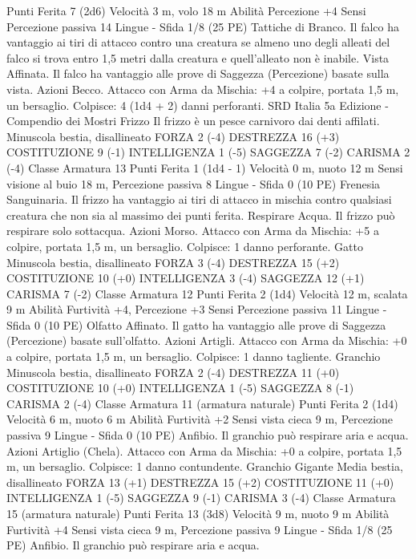 \begin{multicols}{2}
Punti Ferita 7 (2d6)
Velocità 3 m, volo 18 m
Abilità Percezione +4
Sensi Percezione passiva 14
Lingue -
Sfida 1/8 (25 PE)
Tattiche di Branco. Il falco ha vantaggio ai tiri di attacco contro
una creatura se almeno uno degli alleati del falco si trova entro
1,5 metri dalla creatura e quell’alleato non è inabile.
Vista Affinata. Il falco ha vantaggio alle prove di Saggezza
(Percezione) basate sulla vista.
Azioni
Becco. Attacco con Arma da Mischia: +4 a colpire, portata 1,5
m, un bersaglio.
Colpisce: 4 (1d4 + 2) danni perforanti.
SRD Italia 5a Edizione - Compendio dei Mostri
Frizzo
Il frizzo è un pesce carnivoro dai denti affilati.
Minuscola bestia, disallineato
FORZA 2 (-4)
DESTREZZA 16 (+3)
COSTITUZIONE 9 (-1)
INTELLIGENZA 1 (-5)
SAGGEZZA 7 (-2)
CARISMA 2 (-4)
Classe Armatura 13
Punti Ferita 1 (1d4 - 1)
Velocità 0 m, nuoto 12 m
Sensi visione al buio 18 m, Percezione passiva 8
Lingue -
Sfida 0 (10 PE)
Frenesia Sanguinaria. Il frizzo ha vantaggio ai tiri di attacco in
mischia contro qualsiasi creatura che non sia al massimo dei
punti ferita.
Respirare Acqua. Il frizzo può respirare solo sottacqua.
Azioni
Morso. Attacco con Arma da Mischia: +5 a colpire, portata 1,5
m, un bersaglio.
Colpisce: 1 danno perforante.
Gatto
Minuscola bestia, disallineato
FORZA 3 (-4)
DESTREZZA 15 (+2)
COSTITUZIONE 10 (+0)
INTELLIGENZA 3 (-4)
SAGGEZZA 12 (+1)
CARISMA 7 (-2)
Classe Armatura 12
Punti Ferita 2 (1d4)
Velocità 12 m, scalata 9 m
Abilità Furtività +4, Percezione +3
Sensi Percezione passiva 11
Lingue -
Sfida 0 (10 PE)
Olfatto Affinato. Il gatto ha vantaggio alle prove di Saggezza
(Percezione) basate sull’olfatto.
Azioni
Artigli. Attacco con Arma da Mischia: +0 a colpire, portata 1,5
m, un bersaglio.
Colpisce: 1 danno tagliente.
Granchio
Minuscola bestia, disallineato
FORZA 2 (-4)
DESTREZZA 11 (+0)
COSTITUZIONE 10 (+0)
INTELLIGENZA 1 (-5)
SAGGEZZA 8 (-1)
CARISMA 2 (-4)
Classe Armatura 11 (armatura naturale)
Punti Ferita 2 (1d4)
Velocità 6 m, nuoto 6 m
Abilità Furtività +2
Sensi vista cieca 9 m, Percezione passiva 9
Lingue -
Sfida 0 (10 PE)
Anfibio. Il granchio può respirare aria e acqua.
Azioni
Artiglio (Chela). Attacco con Arma da Mischia: +0 a colpire,
portata 1,5 m, un bersaglio.
Colpisce: 1 danno contundente.
Granchio Gigante
Media bestia, disallineato
FORZA 13 (+1)
DESTREZZA 15 (+2)
COSTITUZIONE 11 (+0)
INTELLIGENZA 1 (-5)
SAGGEZZA 9 (-1)
CARISMA 3 (-4)
Classe Armatura 15 (armatura naturale)
Punti Ferita 13 (3d8)
Velocità 9 m, nuoto 9 m
Abilità Furtività +4
Sensi vista cieca 9 m, Percezione passiva 9
Lingue -
Sfida 1/8 (25 PE)
Anfibio. Il granchio può respirare aria e acqua.

\end{multicols}
